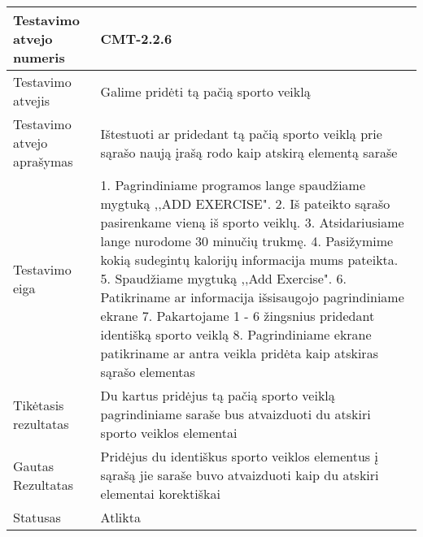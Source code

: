 \documentclass[oneside]{VUMIFPSkursinis}
\begin{document}
\begin{center}
    \begin{tabular}{ |p{5cm}|p{13cm}|}
    \hline
        Testavimo atvejo numeris &  CMT-2.2.6\\ \hline
        Testavimo atvejis & Galime pridėti tą pačią sporto veiklą  \\ \hline
        Testavimo atvejo aprašymas & Ištestuoti ar pridedant tą pačią sporto veiklą prie sąrašo naują įrašą rodo kaip atskirą elementą saraše  \\ \hline
        Testavimo eiga &  1. Pagrindiniame programos lange spaudžiame mygtuką ,,ADD EXERCISE". 
				2. Iš pateikto sąrašo pasirenkame vieną iš sporto veiklų. 
				3. Atsidariusiame lange nurodome 30 minučių trukmę.
				4. Pasižymime kokią sudegintų kalorijų informacija mums pateikta. 
				5. Spaudžiame mygtuką ,,Add Exercise".
				6. Patikriname ar informacija išsisaugojo pagrindiniame ekrane 
				7. Pakartojame 1 - 6 žingsnius pridedant identišką sporto veiklą
				8. Pagrindiniame ekrane patikriname ar antra veikla pridėta kaip atskiras sąrašo elementas \\ \hline
        Tikėtasis rezultatas &  Du kartus pridėjus tą pačią sporto veiklą pagrindiniame saraše bus atvaizduoti du atskiri sporto veiklos elementai\\ \hline
        Gautas Rezultatas &  Pridėjus du identiškus sporto veiklos elementus į sąrašą jie saraše buvo atvaizduoti kaip du atskiri elementai korektiškai\\ \hline
        Statusas & Atlikta \\ \hline
    \hline
    \end{tabular}
\end{center}
\end{document}
